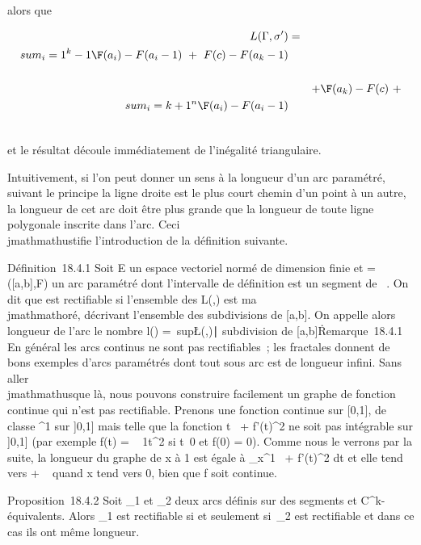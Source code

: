 \documentclass[]{article}
\begin{document}
alors que

\begin{align*} L(\Gamma,\sigma')& =&
\\sum
_i=1^k-1\F(a_ i) -
F(a_i-1)\ +\
F(c) - F(a_k-1)\\%
\\ & &
+\F(a_k) -
F(c)\ + \\sum
_i=k+1^n\F(a_ i) -
F(a_i-1)\\%
\\ \end{align*}

et le résultat découle immédiatement de l'inégalité triangulaire.

Intuitivement, si l'on peut donner un sens à la longueur d'un arc
paramétré, suivant le principe la ligne droite est le plus court chemin
d'un point à un autre, la longueur de cet arc doit être plus grande que
la longueur de toute ligne polygonale inscrite dans l'arc. Ceci \\jmathmathustifie
l'introduction de la définition suivante.

Définition~18.4.1 Soit E un espace vectoriel normé de dimension finie et
\Gamma = ({[}a,b{]},F) un arc paramétré dont l'intervalle de définition est
un segment de \mathbb{R}~. On dit que \Gamma est rectifiable si l'ensemble des L(\Gamma,\sigma)
est ma\\jmathmathoré, \sigma décrivant l'ensemble des subdivisions de {[}a,b{]}. On
appelle alors longueur de l'arc \Gamma le nombre l(\Gamma)
=\
sup\L(\Gamma,\sigma)∣\sigma\text
subdivision de {[}a,b{]}\.

Remarque~18.4.1 En général les arcs continus ne sont pas rectifiables~;
les fractales donnent de bons exemples d'arcs paramétrés dont tout sous
arc est de longueur infini. Sans aller \\jmathmathusque là, nous pouvons
construire facilement un graphe de fonction continue qui n'est pas
rectifiable. Prenons une fonction continue sur {[}0,1{]}, de classe
\mathcal{C}^1 sur {]}0,1{]} mais telle que la fonction
t\mapsto~\sqrt1 +
f'(t)^2 ne soit pas intégrable sur {]}0,1{]} (par exemple
f(t) = \sqrttsin~
1\over  t^2 si
t\neq~0 et f(0) = 0). Comme nous le verrons par
la suite, la longueur du graphe de x à 1 est égale à
\int  _x^1~\sqrt1
+ f'(t)^2 dt et elle tend vers + \infty~ quand x tend vers 0,
bien que f soit continue.

Proposition~18.4.2 Soit \Gamma_1 et \Gamma_2 deux arcs définis
sur des segments et C^k-équivalents. Alors \Gamma_1 est
rectifiable si et seulement si~\Gamma_2 est rectifiable et dans ce
cas ils ont même longueur.
\end{document}
